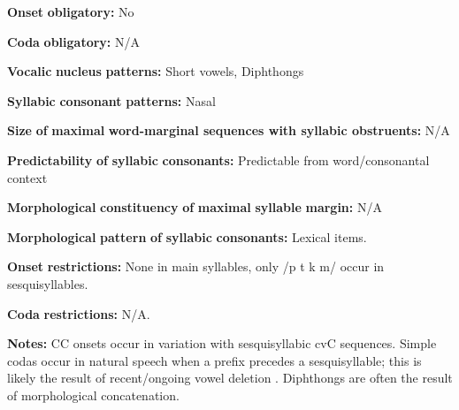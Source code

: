 \begin{styleBody}
\textbf{Onset} \textbf{obligatory:} No
\end{styleBody}

\begin{styleBody}
\textbf{Coda} \textbf{obligatory:} N/A
\end{styleBody}

\begin{styleBody}
\textbf{Vocalic} \textbf{nucleus} \textbf{patterns:} Short vowels, Diphthongs
\end{styleBody}

\begin{styleBody}
\textbf{Syllabic} \textbf{consonant} \textbf{patterns:} Nasal
\end{styleBody}

\begin{styleBody}
\textbf{Size} \textbf{of} \textbf{maximal} \textbf{word{}-marginal sequences with syllabic obstruents:} N/A
\end{styleBody}

\begin{styleBody}
\textbf{Predictability} \textbf{of} \textbf{syllabic} \textbf{consonants:} Predictable from word/consonantal context
\end{styleBody}

\begin{styleBody}
\textbf{Morphological} \textbf{constituency} \textbf{of} \textbf{maximal} \textbf{syllable} \textbf{margin:} N/A
\end{styleBody}

\begin{styleBody}
\textbf{Morphological} \textbf{pattern} \textbf{of} \textbf{syllabic} \textbf{consonants:} Lexical items.
\end{styleBody}

\begin{styleBody}
\textbf{Onset} \textbf{restrictions:} None in main syllables, only /p t k m/ occur in sesquisyllables.
\end{styleBody}

\begin{styleBody}
\textbf{Coda} \textbf{restrictions:} N/A.
\end{styleBody}

\begin{styleBody}
\textbf{Notes:} CC onsets occur in variation with sesquisyllabic cvC sequences. Simple codas occur in natural speech when a prefix precedes a sesquisyllable; this is likely the result of recent/ongoing vowel deletion \citep[62-4]{Teo2009}. Diphthongs are often the result of morphological concatenation.
\end{styleBody}

